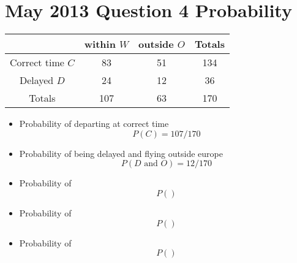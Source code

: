 \section*{May 2013 Question 4 Probability}
\begin{center}
\begin{tabular}{|c|c|c|c|}
\hline  & within $W$ & outside $O$ & Totals \\ 
\hline Correct time $C$ & 83 & 51 & 134 \\ 
\hline Delayed $D$ & 24 & 12 & 36 \\ 
\hline Totals & 107 & 63 & 170 \\ 
\hline 
\end{tabular} 
\end{center}\begin{itemize}
\item Probability of departing at correct time
\[P(C) = 107/170\]
\item Probability of being delayed and flying outside europe 
\[P(D  \mbox{ and } O) = 12/170\]
\item Probability of 
\[P() \]
\item Probability of 
\[P() \]
\item Probability of 
\[P() \]
\end{itemize}
